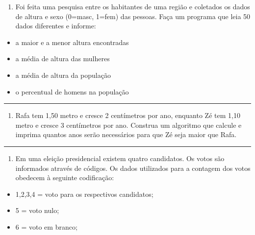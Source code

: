 \documentclass[12pt,a4paper]{article}
\renewcommand{\linethickness}{0.05em}
\providecommand{\tightlist}{%
      \setlength{\itemsep}{0pt}\setlength{\parskip}{0pt}}
\begin{document}
\begin{enumerate}
\def\labelenumi{\arabic{enumi}.}
\setcounter{enumi}{6}
\tightlist
\item
  Foi feita uma pesquisa entre os habitantes de uma região e coletados
  os dados de altura e sexo (0=masc, 1=fem) das pessoas. Faça um
  programa que leia 50 dados diferentes e informe:
\end{enumerate}

\begin{itemize}
\tightlist
\item
  a maior e a menor altura encontradas
\item
  a média de altura das mulheres
\item
  a média de altura da população
\item
  o percentual de homens na população
\end{itemize}

    \begin{center}\rule{0.5\linewidth}{\linethickness}\end{center}

\begin{enumerate}
\def\labelenumi{\arabic{enumi}.}
\setcounter{enumi}{7}
\tightlist
\item
  Rafa tem 1,50 metro e cresce 2 centímetros por ano, enquanto Zé tem
  1,10 metro e cresce 3 centímetros por ano. Construa um algoritmo que
  calcule e imprima quantos anos serão necessários para que Zé seja
  maior que Rafa.
\end{enumerate}

    \begin{center}\rule{0.5\linewidth}{\linethickness}\end{center}

\begin{enumerate}
\def\labelenumi{\arabic{enumi}.}
\setcounter{enumi}{8}
\tightlist
\item
  Em uma eleição presidencial existem quatro candidatos. Os votos são
  informados através de códigos. Os dados utilizados para a contagem dos
  votos obedecem à seguinte codificação:
\end{enumerate}

\begin{itemize}
\item
  1,2,3,4 = voto para os respectivos candidatos;
\item
  5 = voto nulo;
\item
  6 = voto em branco;
\end{itemize}
\end{document}
